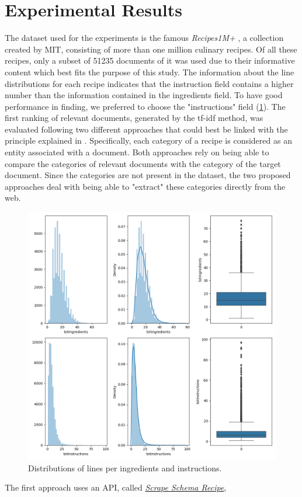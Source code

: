 \section*{Experimental Results}

The dataset used for the experiments is the famous \emph{Recipes1M+} \cite{15}, a collection 
created by MIT, consisting of more than one million culinary recipes. 
Of all these recipes, only a subset of 51235 documents of it was used due 
to their informative content which best fits the purpose of this study. The 
information about the line distributions for each recipe indicates that the 
instruction field contains a higher number than the information contained in 
the ingredients field. To have good performance in finding, we preferred to 
choose the "instructions" field (\ref{distributions}). The first ranking of relevant documents, 
generated by the tf-idf method, was evaluated following two different 
approaches that could best be linked with the principle explained in \cite{16}. 
Specifically, each category of a recipe is considered as an entity associated 
with a document. Both approaches rely on being able to compare the categories of relevant documents 
with the category of the target document. Since the categories are not present in the dataset, the 
two proposed approaches deal with being able to "extract" these categories directly from the web. 
\begin{figure}[h!]
    \centering
    \includegraphics[width = 0.7 \linewidth]{images/displot.png}
    \centering
    \caption{Distributions of lines per ingredients and instructions.}
    \label{distributions}
\end{figure}
The first approach uses an API, called \href{https://pypi.org/project/scrape-schema-recipe/}{\emph{Scrape Schema Recipe}}, 
